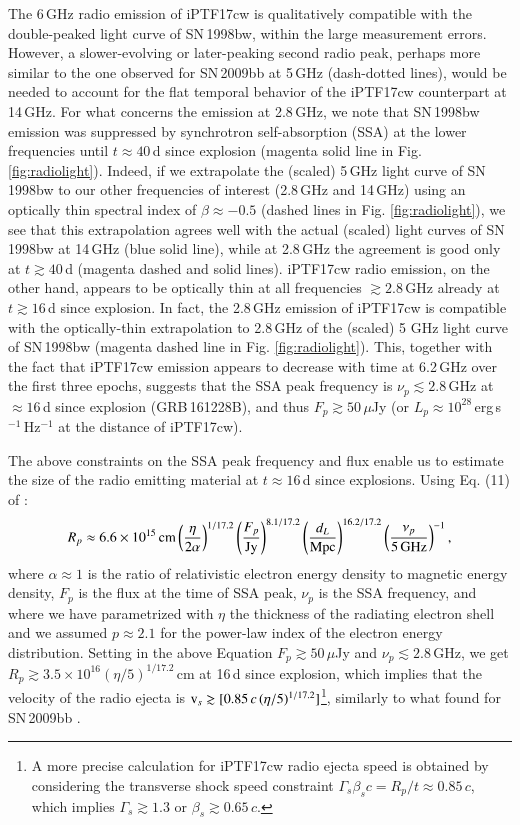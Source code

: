 \documentclass[twocolumn]{emulateapj}
\begin{document}
The 6\,GHz radio emission of iPTF17cw is qualitatively compatible with the double-peaked light curve of SN\,1998bw, within the large measurement errors. However, a slower-evolving or later-peaking second radio peak, perhaps more similar to the one observed for SN\,2009bb at 5\,GHz (dash-dotted lines), would be needed to account for the flat temporal behavior of the iPTF17cw counterpart at 14\,GHz. For what concerns the emission at 2.8\,GHz, we note that SN\,1998bw emission was suppressed by synchrotron self-absorption (SSA) at the lower frequencies until $t\approx 40$\,d since explosion (magenta solid line in Fig. \ref{fig:radiolight}). Indeed, if we extrapolate the (scaled) 5\,GHz light curve of SN\,1998bw to our other frequencies of interest (2.8\,GHz and 14\,GHz) using an optically thin spectral index of $\beta\approx -0.5$ (dashed lines in Fig. \ref{fig:radiolight}), we see that this extrapolation agrees well with the actual (scaled) light curves of SN\,1998bw at 14\,GHz (blue solid line), while at 2.8\,GHz the agreement is good only at $t\gtrsim 40$\,d (magenta dashed and solid lines). iPTF17cw radio emission, on the other hand, appears to be optically thin at all frequencies $\gtrsim 2.8$\,GHz already at $t\gtrsim 16$\,d since explosion. In fact, the 2.8\,GHz emission of iPTF17cw is compatible with the optically-thin extrapolation to 2.8\,GHz of the (scaled) 5 GHz light curve of SN\,1998bw (magenta dashed line in Fig. \ref{fig:radiolight}). This, together with the fact that iPTF17cw emission appears to decrease with time at 6.2\,GHz over the first three epochs, suggests that the SSA peak frequency is $\nu_p\lesssim 2.8$\,GHz at $\approx 16$\,d since explosion (GRB\,161228B), and thus $F_p \gtrsim 50\,\mu$Jy (or $L_p\approx 10^{28}$\,erg\,s$^{-1}$\,Hz$^{-1}$ at the distance of iPTF17cw).

The above constraints on the SSA peak frequency and flux enable us to estimate the size of the radio emitting material at $t\approx16$\,d since explosions. Using Eq. (11) of \citet{Chevalier1998}:
\begin{equation}
R_{p}\approx 6.6\times10^{15}\,{\rm cm}\left(\frac{\eta}{2\alpha}\right)^{1/17.2} \left(\frac{F_p}{\rm Jy}\right)^{8.1/17.2}\left(\frac{d_L}{\rm Mpc}\right)^{16.2/17.2}\left(\frac{\nu_p}{5\,\rm GHz}\right)^{-1},
\label{eq:ejspeed}
\end{equation}
where $\alpha \approx 1$ is the ratio of relativistic electron energy density to magnetic energy density, $F_{p}$  is the flux at the time of SSA peak, $\nu_{p}$ is the SSA frequency, and where we have parametrized with $\eta$ the thickness of the radiating electron shell and we assumed $p\approx 2.1$ for the power-law index of the electron energy distribution. Setting in the above Equation $F_p\gtrsim 50\,\mu$Jy and $\nu_{p}\lesssim 2.8$\,GHz, we get $ R_p\gtrsim 3.5\times10^{16}(\eta/5)^{1/17.2}$\,cm at 16\,d since explosion, which implies that the velocity of the radio ejecta is ${\rm v}_s\gtrsim[0.85\,c\,(\eta/5)^{1/17.2} ]$\footnote{A more precise calculation for iPTF17cw radio ejecta speed is obtained by considering the transverse shock speed constraint $\Gamma_s \beta_s c=R_p/t\approx 0.85\,c $, which implies $\Gamma_s\gtrsim 1.3$ or $\beta_s\gtrsim 0.65\,c$.}, similarly to what found for SN\,2009bb \citep{Soderberg2010}.
\end{document}
